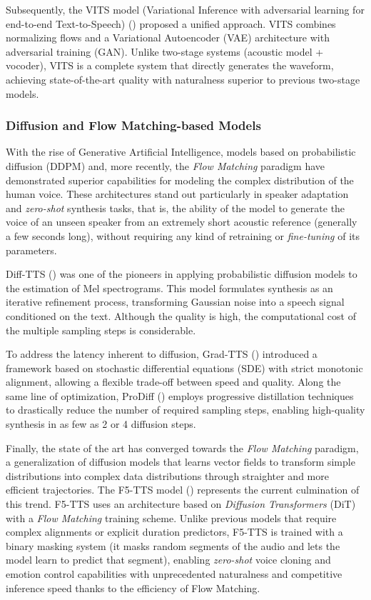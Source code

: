 Subsequently, the VITS model (Variational Inference with adversarial learning for end-to-end Text-to-Speech) (\cite{kim2021conditional}) proposed a unified approach. VITS combines normalizing flows and a Variational Autoencoder (VAE) architecture with adversarial training (GAN). Unlike two-stage systems (acoustic model + vocoder), VITS is a complete system that directly generates the waveform, achieving state-of-the-art quality with naturalness superior to previous two-stage models.

\subsubsection{Diffusion and Flow Matching-based Models}
With the rise of Generative Artificial Intelligence, models based on probabilistic diffusion (DDPM) and, more recently, the \textit{Flow Matching} paradigm have demonstrated superior capabilities for modeling the complex distribution of the human voice. These architectures stand out particularly in speaker adaptation and \textit{zero-shot} synthesis tasks, that is, the ability of the model to generate the voice of an unseen speaker from an extremely short acoustic reference (generally a few seconds long), without requiring any kind of retraining or \textit{fine-tuning} of its parameters.

Diff-TTS (\cite{jeong2021diff}) was one of the pioneers in applying probabilistic diffusion models to the estimation of Mel spectrograms. This model formulates synthesis as an iterative refinement process, transforming Gaussian noise into a speech signal conditioned on the text. Although the quality is high, the computational cost of the multiple sampling steps is considerable.

To address the latency inherent to diffusion, Grad-TTS (\cite{popov2021grad}) introduced a framework based on stochastic differential equations (SDE) with strict monotonic alignment, allowing a flexible trade-off between speed and quality. Along the same line of optimization, ProDiff (\cite{huang2022prodiff}) employs progressive distillation techniques to drastically reduce the number of required sampling steps, enabling high-quality synthesis in as few as 2 or 4 diffusion steps.

Finally, the state of the art has converged towards the \textit{Flow Matching} paradigm, a generalization of diffusion models that learns vector fields to transform simple distributions into complex data distributions through straighter and more efficient trajectories. The F5-TTS model (\cite{chen2024f5}) represents the current culmination of this trend. F5-TTS uses an architecture based on \textit{Diffusion Transformers} (DiT) with a \textit{Flow Matching} training scheme. Unlike previous models that require complex alignments or explicit duration predictors, F5-TTS is trained with a binary masking system (it masks random segments of the audio and lets the model learn to predict that segment), enabling \textit{zero-shot} voice cloning and emotion control capabilities with unprecedented naturalness and competitive inference speed thanks to the efficiency of Flow Matching.

